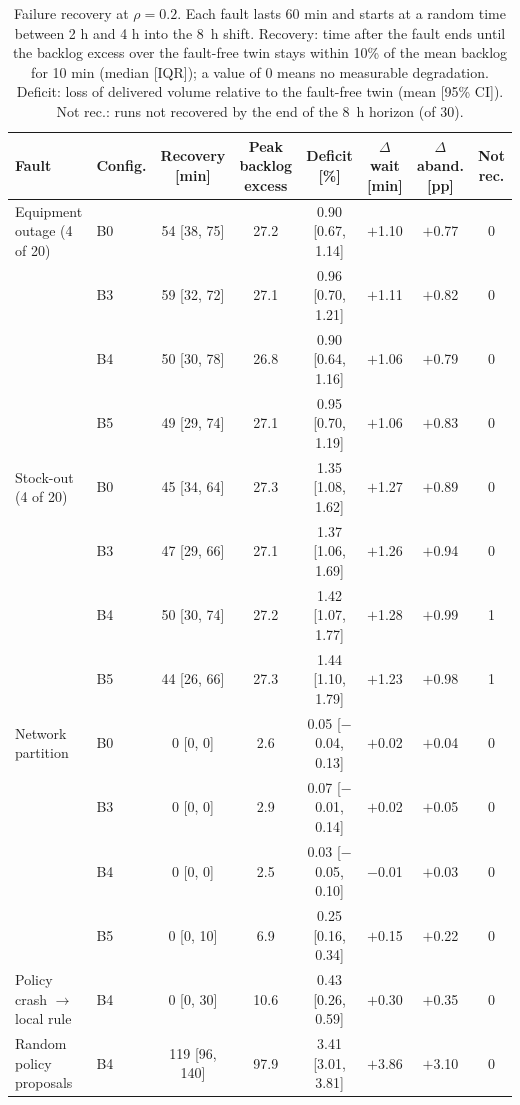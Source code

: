 \begin{table}[!t]
\caption{Failure recovery at $\rho=0.2$. Each fault lasts 60 min and starts at a random time between 2 h and 4 h into the 8~h shift. Recovery: time after the fault ends until the backlog excess over the fault-free twin stays within 10\% of the mean backlog for 10 min (median [IQR]); a value of 0 means no measurable degradation. Deficit: loss of delivered volume relative to the fault-free twin (mean [95\% CI]). Not rec.: runs not recovered by the end of the 8~h horizon (of 30).}
\label{tabflt}
\centering\footnotesize
\begin{tabular}{llcccccc}
\toprule
Fault & Config. & Recovery [min] & Peak backlog excess & Deficit [\%] & $\Delta$ wait [min] & $\Delta$ aband. [pp] & Not rec. \\
\midrule
Equipment outage (4 of 20) & B0 & 54 [38, 75] & 27.2 & 0.90 [0.67, 1.14] & $+$1.10 & $+$0.77 & 0 \\
 & B3 & 59 [32, 72] & 27.1 & 0.96 [0.70, 1.21] & $+$1.11 & $+$0.82 & 0 \\
 & B4 & 50 [30, 78] & 26.8 & 0.90 [0.64, 1.16] & $+$1.06 & $+$0.79 & 0 \\
 & B5 & 49 [29, 74] & 27.1 & 0.95 [0.70, 1.19] & $+$1.06 & $+$0.83 & 0 \\
\midrule
Stock-out (4 of 20) & B0 & 45 [34, 64] & 27.3 & 1.35 [1.08, 1.62] & $+$1.27 & $+$0.89 & 0 \\
 & B3 & 47 [29, 66] & 27.1 & 1.37 [1.06, 1.69] & $+$1.26 & $+$0.94 & 0 \\
 & B4 & 50 [30, 74] & 27.2 & 1.42 [1.07, 1.77] & $+$1.28 & $+$0.99 & 1 \\
 & B5 & 44 [26, 66] & 27.3 & 1.44 [1.10, 1.79] & $+$1.23 & $+$0.98 & 1 \\
\midrule
Network partition & B0 & 0 [0, 0] & 2.6 & 0.05 [$-$0.04, 0.13] & $+$0.02 & $+$0.04 & 0 \\
 & B3 & 0 [0, 0] & 2.9 & 0.07 [$-$0.01, 0.14] & $+$0.02 & $+$0.05 & 0 \\
 & B4 & 0 [0, 0] & 2.5 & 0.03 [$-$0.05, 0.10] & $-$0.01 & $+$0.03 & 0 \\
 & B5 & 0 [0, 10] & 6.9 & 0.25 [0.16, 0.34] & $+$0.15 & $+$0.22 & 0 \\
\midrule
Policy crash $\rightarrow$ local rule & B4 & 0 [0, 30] & 10.6 & 0.43 [0.26, 0.59] & $+$0.30 & $+$0.35 & 0 \\
\midrule
Random policy proposals & B4 & 119 [96, 140] & 97.9 & 3.41 [3.01, 3.81] & $+$3.86 & $+$3.10 & 0 \\
\bottomrule
\end{tabular}
\end{table}
